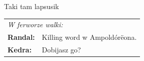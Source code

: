 \documentclass[10pt,twoside,twocolumn]{book}
\begin{document}
\begin{rpg-quotebox}{Taki tam lapsusik}
   \begin{tabularx}{\columnwidth}{lX}
      \multicolumn{2}{l}{\textit{W ferworze walki:}}\\
      \textbf{Randal:} & Killing word w Ampoldórëona.\\
      \textbf{Kedra:} & Dobijasz go?\\
   \end{tabularx}
\end{rpg-quotebox}
% 
% 
% 
% 
% 
% 
% 
\end{document}
